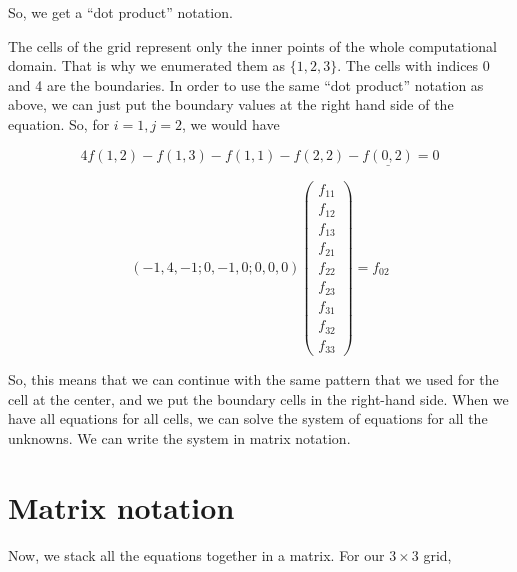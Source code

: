 \documentclass{article}
\begin{document}
So, we get a ``dot product'' notation.

The cells of the grid represent only the inner points of the whole computational domain.
That is why we enumerated them as $\{1,2,3\}$. The cells with indices 0 and 4 are
the boundaries. In order to use the same ``dot product'' notation as above, we can just put the
boundary values at the right hand side of the equation. So, for $i=1,j=2$, we would have

\[ 4f(1,2) - f(1,3) - f(1,1) - f(2,2) - \underline{f(0,2)} = 0 \]

\[ ( -1, 4, -1; 0, -1, 0; 0, 0, 0 )
\left(
\begin{matrix}
f_{11}\\
f_{12}\\
f_{13}\\
f_{21}\\
f_{22}\\
f_{23}\\
f_{31}\\
f_{32}\\
f_{33}
\end{matrix}
\right)
=
f_{02}
 \]

So, this means that we can continue with the same pattern that we used for the
cell at the center, and we put the boundary cells in the right-hand side. When
we have all equations for all cells, we can solve the system of equations for
all the unknowns. We can write the system in matrix notation.

\section{Matrix notation}

Now, we stack all the equations together in a matrix. For our $3\times 3$ grid,
\end{document}
